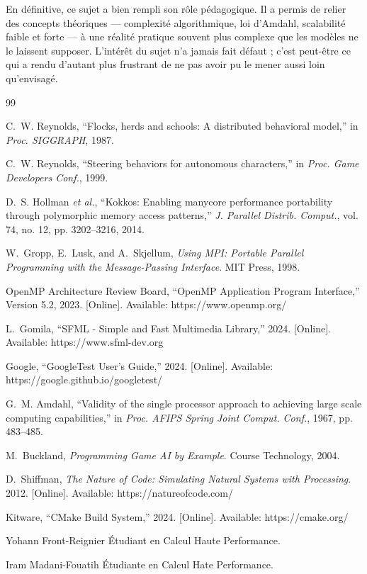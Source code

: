 \documentclass[conference]{IEEEtran}
\begin{document}
En définitive, ce sujet a bien rempli son rôle pédagogique. Il a permis
de relier des concepts théoriques — complexité algorithmique, loi
d'Amdahl, scalabilité faible et forte — à une réalité pratique souvent
plus complexe que les modèles ne le laissent supposer. L'intérêt du
sujet n'a jamais fait défaut ; c'est peut-être ce qui a rendu d'autant
plus frustrant de ne pas avoir pu le mener aussi loin qu'envisagé.
\newpage



\begin{thebibliography}{99}

	C.~W. Reynolds, ``Flocks, herds and schools: A distributed behavioral model,'' in \emph{Proc. SIGGRAPH}, 1987.

	C.~W. Reynolds, ``Steering behaviors for autonomous characters,'' in \emph{Proc. Game Developers Conf.}, 1999.

	D.~S. Hollman \emph{et al.}, ``Kokkos: Enabling manycore performance portability through polymorphic memory access patterns,'' \emph{J. Parallel Distrib. Comput.}, vol. 74, no. 12, pp. 3202--3216, 2014.

	W.~Gropp, E.~Lusk, and A.~Skjellum, \emph{Using MPI: Portable Parallel Programming with the Message-Passing Interface}. MIT Press, 1998.

	OpenMP Architecture Review Board, ``OpenMP Application Program Interface,'' Version 5.2, 2023. [Online]. Available: https://www.openmp.org/

	L.~Gomila, ``SFML - Simple and Fast Multimedia Library,'' 2024. [Online]. Available: https://www.sfml-dev.org

	Google, ``GoogleTest User's Guide,'' 2024. [Online]. Available: https://google.github.io/googletest/

	G.~M. Amdahl, ``Validity of the single processor approach to achieving large scale computing capabilities,'' in \emph{Proc. AFIPS Spring Joint Comput. Conf.}, 1967, pp. 483--485.

	M.~Buckland, \emph{Programming Game AI by Example}. Course Technology, 2004.

	D.~Shiffman, \emph{The Nature of Code: Simulating Natural Systems with Processing}. 2012. [Online]. Available: https://natureofcode.com/

	Kitware, ``CMake Build System,'' 2024. [Online]. Available: https://cmake.org/

\end{thebibliography}



\begin{IEEEbiographynophoto}{Yohann Front-Reignier}
	Étudiant en Calcul Haute Performance.
\end{IEEEbiographynophoto}

\begin{IEEEbiographynophoto}{Iram Madani-Fouatih}
	Étudiante en Calcul Hate Performance.
\end{IEEEbiographynophoto}
\end{document}
